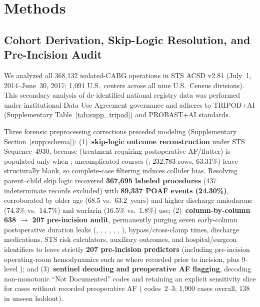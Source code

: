 \section{Methods}
\label{sec:methods}

\subsection{Cohort Derivation, Skip-Logic Resolution, and Pre-Incision Audit}
We analyzed all 368,132 isolated-CABG operations in STS ACSD v2.81 (July~1, 2014--June~30, 2017; 1,091 U.S.\ centers across all nine U.S.\ Census divisions).\cite{sts2014v281,shahian2018sts,obrien2018sts2} This secondary analysis of de-identified national registry data was performed under institutional Data Use Agreement governance and adheres to TRIPOD+AI (Supplementary Table~\ref{tab:supp_tripod}) and PROBAST+AI standards.\cite{collins2024tripodai,moons2025probastai}

Three forensic preprocessing corrections preceded modeling (Supplementary Section~\ref{supp:schema}): (1)~\textbf{skip-logic outcome reconstruction} under STS Sequence~4930, because  (treatment-requiring postoperative AF/flutter) is populated only when ; uncomplicated courses (; 232,783 rows, 63.31\%) leave  structurally blank, so complete-case filtering induces collider bias.\cite{hernan2020causal} Resolving parent--child skip logic recovered \textbf{367,695 labeled procedures} (437 indeterminate records excluded) with \textbf{89,337 POAF events (24.30\%)}, corroborated by older age (68.5 vs.\ 63.2~years) and higher discharge amiodarone (74.3\% vs.\ 14.7\%) and warfarin (16.5\% vs.\ 1.8\%) use; (2)~\textbf{column-by-column 638 $\to$ 207 pre-incision audit}, permanently purging seven early-column postoperative duration leaks (, , , , , , ), bypass/cross-clamp times, discharge medications, STS risk calculators, auxiliary outcomes, and hospital/surgeon identifiers to leave strictly \textbf{207 pre-incision predictors} (including pre-incision operating-room hemodynamics such as  where recorded prior to incision, plus 9-level ); and (3)~\textbf{sentinel decoding and preoperative AF flagging}, decoding non-monotonic ``Not Documented'' codes and retaining an explicit sensitivity slice for cases without recorded preoperative AF ( codes~2--3; 1,900 cases overall, 138 in unseen holdout).

